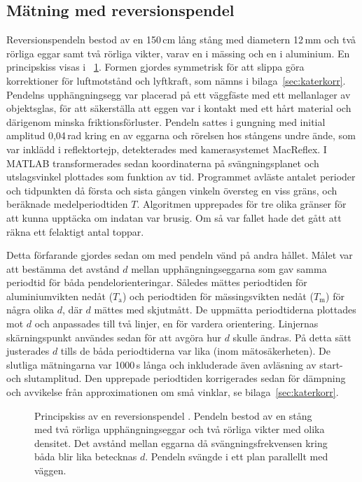 \documentclass[11pt,a4paper]{article}
\newcommand{\figref}{\figurename~\ref}
\begin{document}
\subsection{Mätning med reversionspendel}
Reversionspendeln bestod av en 150\,cm lång stång med diametern 12\,mm och två rörliga eggar samt två rörliga vikter, varav en i mässing och en i aluminium. En principskiss visas i \figref{fig:kater}. Formen gjordes symmetrisk för att slippa göra korrektioner för luftmotstånd och lyftkraft, som nämns i bilaga~\ref{sec:katerkorr}. Pendelns upphängningsegg var placerad på ett väggfäste med ett mellanlager av objektsglas, för att säkerställa att eggen var i kontakt med ett hårt material och därigenom minska friktionsförluster. %
Pendeln sattes i gungning med initial amplitud 0,04\,rad kring en av eggarna och rörelsen hos stångens undre ände, som var inklädd i reflektortejp, detekterades med kamerasystemet MacReflex. I MATLAB transformerades sedan koordinaterna på svängningsplanet och utslagsvinkel plottades som funktion av tid. Programmet avläste antalet perioder och tidpunkten då första och sista gången vinkeln översteg en viss gräns, och beräknade medelperiodtiden $T$. Algoritmen upprepades för tre olika gränser för att kunna upptäcka om indatan var brusig. Om så var fallet hade det gått att räkna ett felaktigt antal toppar.

Detta förfarande gjordes sedan om med pendeln vänd på andra hållet. Målet var att bestämma det avstånd $d$ mellan upphängningseggarna som gav samma periodtid för båda pendelorienteringar. Således mättes periodtiden för aluminiumvikten nedåt ($T_\mathrm{a}$) och periodtiden för mässingsvikten nedåt ($T_\mathrm{m}$) för några olika $d$, där $d$ mättes med skjutmått. De uppmätta periodtiderna plottades mot $d$ och anpassades till två linjer, en för vardera orientering. Linjernas skärningspunkt användes sedan för att avgöra hur $d$ skulle ändras. På detta sätt justerades $d$ tills de båda periodtiderna var lika (inom mätosäkerheten). De slutliga mätningarna var 1000\,s långa och inkluderade även avläsning av start- och slutamplitud.
Den upprepade periodtiden korrigerades sedan för dämpning och avvikelse från approximationen om små vinklar, se bilaga~\ref{sec:katerkorr}.
\begin{figure}
\centering
\resizebox{0.15\textwidth}{!}{}
\caption{Principskiss av en reversionspendel \cite{beckman}. Pendeln bestod av en stång med två rörliga upphängningseggar och två rörliga vikter med olika densitet. Det avstånd mellan eggarna då svängningsfrekvensen kring båda blir lika betecknas $d$. Pendeln svängde i ett plan parallellt med väggen.}
\label{fig:kater}
\end{figure}
\end{document}
